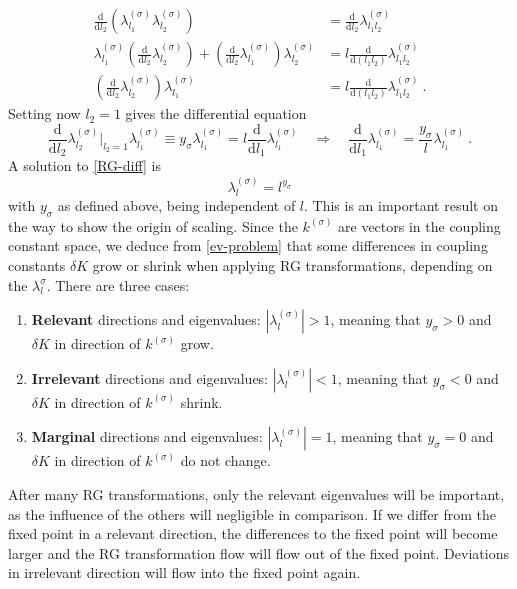 	\begin{equation}
		\begin{split}
			\frac{\text{d}}{\text{d}l_2} \left(\lambda_{l_1}^{(\sigma)} \lambda_{l_2}^{(\sigma)}\right) &= 	\frac{\text{d}}{\text{d}l_2} \lambda_{l_1l_2}^{(\sigma)} \\
			\lambda_{l_1}^{(\sigma)}  \left(\frac{\text{d}}{\text{d}l_2} \lambda_{l_2}^{(\sigma)}\right) +  			  \left( \frac{\text{d}}{\text{d}l_2} \lambda_{l_1}^{(\sigma)}\right) \lambda_{l_2}^{(\sigma)} &= l \frac{\text{d}}{\text{d}(l_1l_2)} \lambda_{l_1l_2}^{(\sigma)} \\
			\left(\frac{\text{d}}{\text{d}l_2} \lambda_{l_2}^{(\sigma)}\right) \lambda_{l_1}^{(\sigma)}   &= l \frac{\text{d}}{\text{d}(l_1l_2)} \lambda_{l_1l_2}^{(\sigma)}	~.
		\end{split}
	\end{equation}
	Setting now $l_2 =	1$ gives the differential equation
	\begin{equation}\label{RG-diff}
		\frac{\text{d}}{\text{d}l_2} \lambda_{l_2}^{(\sigma)} \bigg |_{l_2 =	1} \lambda_{l_1}^{(\sigma)}   \equiv y_\sigma \lambda_{l_1}^{(\sigma)} = l \frac{\text{d}}{\text{d}l_1} \lambda_{l_1}^{(\sigma)} \quad \Rightarrow \quad \frac{\text{d}}{\text{d}l_1} \lambda_{l_1}^{(\sigma)} =	\frac{y_\sigma}{l} \lambda_{l_1}^{(\sigma)} ~.		
	\end{equation}
	A solution to \autoref{RG-diff} is
	\begin{equation} \label{ev-form}
		\lambda_l^{(\sigma)} = l^{y_\sigma}	
	\end{equation}
	with $y_\sigma$ as defined above, being independent of $l$. This is an important result on the way to show the origin of scaling. Since the $k^{(\sigma)}$ are vectors in the coupling constant space, we deduce from \autoref{ev-problem} that some differences in coupling constants $\delta K$ grow or shrink when applying RG transformations, depending on the $\lambda_l^{\sigma}$. There are three cases:
	\begin{enumerate}
		\item \textbf{Relevant} directions and eigenvalues:	$|\lambda_l^{(\sigma)}| > 1$, meaning that $y_\sigma > 0$ and $\delta K$ in direction of $k^{(\sigma)}$ grow.
		\item \textbf{Irrelevant} directions and eigenvalues:	$|\lambda_l^{(\sigma)}| < 1$, meaning that $y_\sigma < 0$ and $\delta K$ in direction of $k^{(\sigma)}$ shrink.
		\item \textbf{Marginal} directions and eigenvalues:	$|\lambda_l^{(\sigma)}| = 1$, meaning that $y_\sigma = 0$ and $\delta K$ in direction of $k^{(\sigma)}$ do not change.
	\end{enumerate}
	After many RG transformations, only the relevant eigenvalues will be important, as the influence of the others will negligible in comparison. If we differ from the fixed point in a relevant direction, the differences to the fixed point will become larger and the RG transformation flow will flow out of the fixed point. Deviations in irrelevant direction will flow into the fixed point again. \\
	
